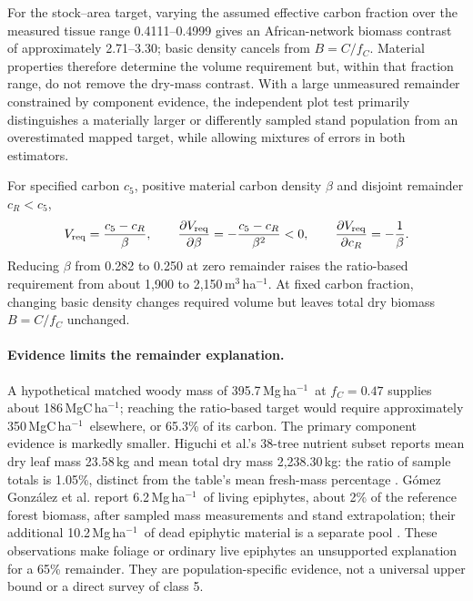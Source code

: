 \documentclass[11pt,a4paper]{article}
\theoremstyle{remark}
\begin{document}
For the stock--area target, varying the assumed effective carbon fraction over the measured tissue range 0.4111--0.4999 gives an African-network biomass contrast of approximately 2.71--3.30; basic density cancels from $B=C/f_C$. Material properties therefore determine the volume requirement but, within that fraction range, do not remove the dry-mass contrast. With a large unmeasured remainder constrained by component evidence, the independent plot test primarily distinguishes a materially larger or differently sampled stand population from an overestimated mapped target, while allowing mixtures of errors in both estimators.

For specified carbon $c_5$, positive material carbon density $\beta$ and disjoint remainder $c_R<c_5$,
\[
 V_{\rm req}=\frac{c_5-c_R}{\beta},\qquad
 \frac{\partial V_{\rm req}}{\partial\beta}=-\frac{c_5-c_R}{\beta^2}<0,
 \qquad \frac{\partial V_{\rm req}}{\partial c_R}=-\frac1\beta.
\]
Reducing $\beta$ from 0.282 to 0.250 at zero remainder raises the ratio-based requirement from about 1,900 to 2,150\,m$^3$\,ha$^{-1}$. At fixed carbon fraction, changing basic density changes required volume but leaves total dry biomass $B=C/f_C$ unchanged.

\paragraph{Evidence limits the remainder explanation.}
A hypothetical matched woody mass of 395.7\,Mg\,ha$^{-1}$\ at $f_C=0.47$ supplies about 186\,MgC\,ha$^{-1}$; reaching the ratio-based target would require approximately 350\,MgC\,ha$^{-1}$\ elsewhere, or 65.3\% of its carbon. The primary component evidence is markedly smaller. Higuchi et al.'s 38-tree nutrient subset reports mean dry leaf mass 23.58\,kg and mean total dry mass 2,238.30\,kg: the ratio of sample totals is 1.05\%, distinct from the table's mean fresh-mass percentage \citep[Table~3(b)]{Higuchi1998}. G\'omez Gonz\'alez et al. report 6.2\,Mg\,ha$^{-1}$\ of living epiphytes, about 2\% of the reference forest biomass, after sampled mass measurements and stand extrapolation; their additional 10.2\,Mg\,ha$^{-1}$\ of dead epiphytic material is a separate pool \citep{Gomez2017}. These observations make foliage or ordinary live epiphytes an unsupported explanation for a 65\% remainder. They are population-specific evidence, not a universal upper bound or a direct survey of class 5.
\end{document}
